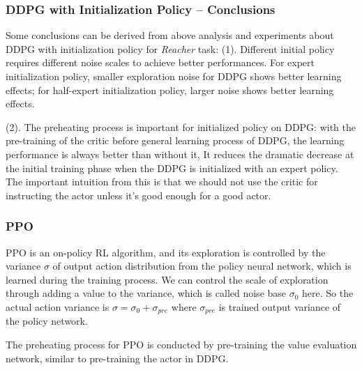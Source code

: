 \documentclass{article}
\begin{document}
\subsubsection{DDPG with Initialization Policy -- Conclusions}
Some conclusions can be derived from above analysis and experiments about DDPG with initialization policy for \textit{Reacher} task:
(1). Different initial policy requires different noise scales to achieve better performances. For expert initialization policy, smaller exploration noise for DDPG shows better learning effects; for half-expert initialization policy, larger noise shows better learning effects.

(2). The preheating process is important for initialized policy on DDPG: with the pre-training of the critic before general learning process of DDPG, the learning performance is always better than without it, It reduces the dramatic decrease at the initial training phase when the DDPG is initialized with an expert policy. The important intuition from this is that we should not use the critic for instructing the actor unless it's good enough for a good actor.


\subsubsection{PPO}
PPO is an on-policy RL algorithm, and its exploration is controlled by the variance $\sigma$ of output action distribution from the policy neural network, which is learned during the training process. We can control the scale of exploration through adding a value to the variance, which is called noise base $\sigma_0$ here. So the actual action variance is $\sigma =\sigma_0+\sigma_{pre}$ where $\sigma_{pre}$ is trained output variance of the policy network.

The preheating process for PPO is conducted by pre-training the value evaluation network, similar to pre-training the actor in DDPG. 
\end{document}
